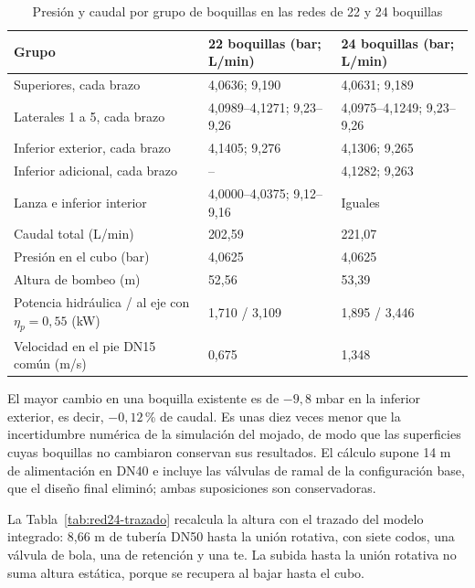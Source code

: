 \begin{table}[htbp]
\centering\small\singlespacing
\caption{Presión y caudal por grupo de boquillas en las redes de 22 y 24 boquillas}
\label{tab:red24-boquillas}
\begin{tabularx}{\textwidth}{@{}YP{3.6cm}P{3.6cm}@{}}
\toprule
\textbf{Grupo} & \textbf{22 boquillas (bar; L/min)} & \textbf{24 boquillas (bar; L/min)}\\
\midrule
Superiores, cada brazo & 4,0636; 9,190 & 4,0631; 9,189\\
Laterales 1 a 5, cada brazo & 4,0989--4,1271; 9,23--9,26 & 4,0975--4,1249; 9,23--9,26\\
Inferior exterior, cada brazo & 4,1405; 9,276 & 4,1306; 9,265\\
Inferior adicional, cada brazo & -- & 4,1282; 9,263\\
Lanza e inferior interior & 4,0000--4,0375; 9,12--9,16 & Iguales\\
\midrule
Caudal total (L/min) & 202,59 & 221,07\\
Presión en el cubo (bar) & 4,0625 & 4,0625\\
Altura de bombeo (m) & 52,56 & 53,39\\
Potencia hidráulica / al eje con $\eta_p=0{,}55$ (kW) & 1,710 / 3,109 & 1,895 / 3,446\\
Velocidad en el pie DN15 común (m/s) & 0,675 & 1,348\\
\bottomrule
\end{tabularx}
\end{table}

El mayor cambio en una boquilla existente es de $-9{,}8$ mbar en la inferior exterior, es decir, $-0{,}12$\,\% de caudal. Es unas diez veces menor que la incertidumbre numérica de la simulación del mojado, de modo que las superficies cuyas boquillas no cambiaron conservan sus resultados. El cálculo supone 14 m de alimentación en DN40 e incluye las válvulas de ramal de la configuración base, que el diseño final eliminó; ambas suposiciones son conservadoras.

La Tabla~\ref{tab:red24-trazado} recalcula la altura con el trazado del modelo integrado: 8,66 m de tubería DN50 hasta la unión rotativa, con siete codos, una válvula de bola, una de retención y una te. La subida hasta la unión rotativa no suma altura estática, porque se recupera al bajar hasta el cubo.

